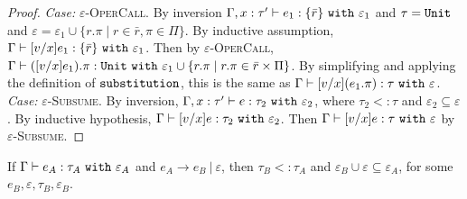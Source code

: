 \documentclass[acmsmall,review,anonymous]{acmart}\settopmatter{printfolios=true}
\begin{document}
\begin{proof}
\textit{Case:} \textsc{$\varepsilon$-OperCall}. By inversion $ \Gamma, x:  \tau' \vdash  e_1: \{ \bar r \}~\mathtt{with}~ \varepsilon_1$ and $\tau = \mathtt{Unit}$ and $\varepsilon = \varepsilon_1 \cup \{ r.\pi \mid r \in \bar r, \pi \in \Pi \}$. By inductive assumption, $ \Gamma \vdash [ v/x] e_1 : \{ \bar r \} ~\mathtt{with}~ \varepsilon_1$. Then by \textsc{$\varepsilon$-OperCall}, $ \Gamma \vdash ([ v/x] e_1).\pi: \mathtt{Unit}~\mathtt{with}~ \varepsilon_1 \cup \{ r.\pi \mid r.\pi \in \bar r \times \Pi \}$. By simplifying and applying the definition of $\mathtt{substitution}$, this is the same as $ \Gamma \vdash [ v/x]( e_1.\pi):  \tau~\mathtt{with}~ \varepsilon$.\\

\textit{Case:} \textsc{$\varepsilon$-Subsume}. By inversion, $ \Gamma, x:  \tau' \vdash  e:  \tau_2~\mathtt{with}~ \varepsilon_2$, where $ \tau_2 <:  \tau$ and $\varepsilon_2 \subseteq \varepsilon$. By inductive hypothesis, $ \Gamma \vdash [ v/x] e:  \tau_2~\mathtt{with}~ \varepsilon_2$. Then $ \Gamma \vdash [ v/x] e:  \tau~\mathtt{with}~ \varepsilon$ by \textsc{$\varepsilon$-Subsume}.

\end{proof}


\hrulefill


\begin{theorem}
If $\Gamma \vdash e_A: \tau_A~\mathtt{with}~ \varepsilon_A$ and $e_A \longrightarrow e_B~|~\varepsilon$, then $\tau_B <: \tau_A$ and $\varepsilon_B \cup \varepsilon \subseteq \varepsilon_A$, for some $e_B, \varepsilon, \tau_B, \varepsilon_B$.
\end{theorem}
\end{document}
